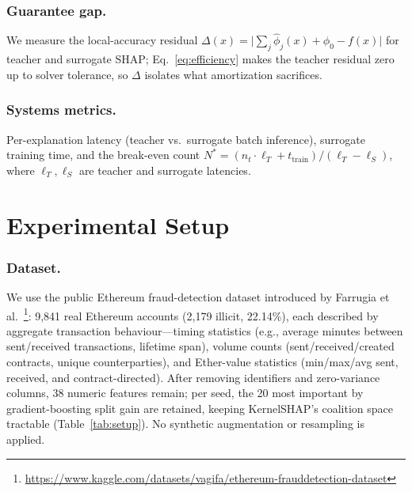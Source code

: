\documentclass[runningheads]{llncs}
\begin{document}
\subsubsection{Guarantee gap.}
We measure the local-accuracy residual
$\Delta(x) = \bigl|\sum_j \hat\phi_j(x) + \phi_0 - f(x)\bigr|$
for teacher and surrogate SHAP; Eq.~\eqref{eq:efficiency} makes the teacher
residual zero up to solver tolerance, so $\Delta$ isolates what
amortization sacrifices.

\subsubsection{Systems metrics.}
Per-explanation latency (teacher vs.\ surrogate batch inference), surrogate
training time, and the break-even count
$N^\ast = (n_t \cdot \ell_T + t_{\mathrm{train}}) / (\ell_T - \ell_S)$,
where $\ell_T, \ell_S$ are teacher and surrogate latencies.

\section{Experimental Setup}
\label{sec:setup}

\subsubsection{Dataset.}
We use the public Ethereum fraud-detection dataset introduced by Farrugia
et al.\ \cite{farrugia2020}\footnote{\url{https://www.kaggle.com/datasets/vagifa/ethereum-frauddetection-dataset}}:
9{,}841 real Ethereum accounts (2{,}179 illicit, 22.14\%), each described
by aggregate transaction behaviour---timing statistics (e.g., average
minutes between sent/received transactions, lifetime span), volume counts
(sent/received/created contracts, unique counterparties), and Ether-value
statistics (min/max/avg sent, received, and contract-directed). After
removing identifiers and zero-variance columns, 38 numeric features remain;
per seed, the 20 most important by gradient-boosting split gain are
retained, keeping KernelSHAP's coalition space tractable
(Table~\ref{tab:setup}). No synthetic augmentation or resampling is
applied.
\end{document}
